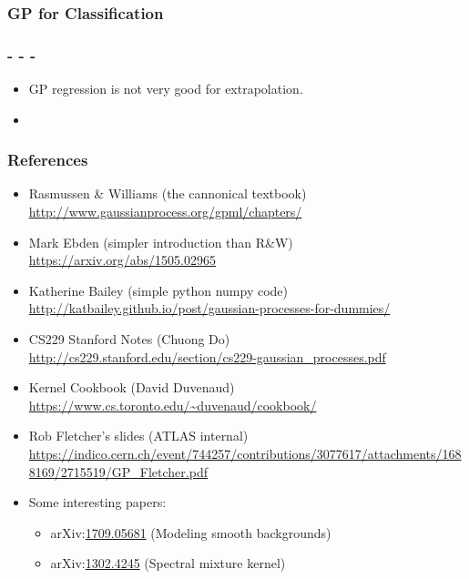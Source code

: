 \begin{frame} \frametitle{GP for Classification}
\end{frame}

\begin{frame} \frametitle{- - -}
\begin{itemize}
  \item GP regression is not very good for extrapolation.
  \item {}
\end{itemize}
\end{frame}

\newcommand{\R}[2]{\item #1 \\ {\scriptsize\url{#2}}}
\newcommand{\arxiv}[1]{arXiv:\href{https://arxiv.org/abs/#1}{#1}}

\begin{frame} \frametitle{References}
\begin{itemize}
  \R{Rasmussen \& Williams (the cannonical textbook)}
    {http://www.gaussianprocess.org/gpml/chapters/}
  \R{Mark Ebden {\small(simpler introduction than R\&W)}}
    {https://arxiv.org/abs/1505.02965}
  \R{Katherine Bailey {\small(simple python\,\plus\,numpy code)}}
    {http://katbailey.github.io/post/gaussian-processes-for-dummies/}
  \R{CS229 Stanford Notes (Chuong Do)}
    {http://cs229.stanford.edu/section/cs229-gaussian_processes.pdf}
  \R{Kernel Cookbook (David Duvenaud)}
    {https://www.cs.toronto.edu/~duvenaud/cookbook/}
  \R{Rob Fletcher's slides (ATLAS internal)}
    {https://indico.cern.ch/event/744257/contributions/3077617/attachments/1688169/2715519/GP_Fletcher.pdf}
  \item Some interesting papers:
  \begin{itemize}
    \item \arxiv{1709.05681} (Modeling smooth backgrounds)
    \item \arxiv{1302.4245} (Spectral mixture kernel)
  \end{itemize}
\end{itemize}
\end{frame}

